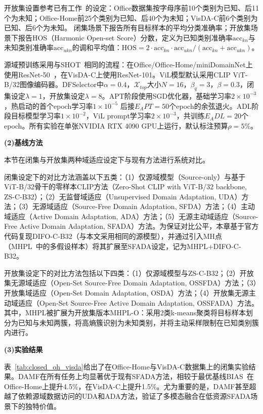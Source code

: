 开放集设置参考已有工作~\cite{liu2021separate}的设定：Office数据集按字母序前10个类别为已知、后11个为未知；Office-Home前25个类别为已知、后40个为未知；VisDA-C前6个类别为已知、后6个为未知。
闭集场景下报告所有目标样本的平均分类准确率；开放集场景下报告HOS（Harmonic Open-set Score）分数，定义为已知类别准确率$\mathrm{acc}_{kn}$与未知类别准确率$\mathrm{acc}_{ukn}$的调和平均值：$\mathrm{HOS}=2\cdot\mathrm{acc}_{kn}\cdot\mathrm{acc}_{ukn}/(\mathrm{acc}_{kn}+\mathrm{acc}_{ukn})$。

源域预训练采用与SHOT~\cite{liang2021source}相同的流程：在Office/Office-Home/miniDomainNet上使用ResNet-50~\cite{he2016deep}，在VisDA-C上使用ResNet-101。ViL模型默认采用CLIP ViT-B/32图像编码器。DFSelector中$\alpha=0.4$，$\mathcal{X}_{top}$大小$N=16$，$\beta_q=3$，$\beta=0.3$，闭集设定$\lambda=1$，开放集设定$\lambda=8$。APT阶段使用SGD优化器，基础学习率$2\times 10^{-3}$，热启动的首个epoch学习率$1\times 10^{-5}$ 后接$E_APT=50$个epoch的余弦退火。ADL阶段目标模型学习率$1\times 10^{-2}$，ViL prompt学习率$2\times 10^{-3}$，共训练$E_ADL=20$个epoch。所有实验在单张NVIDIA RTX 4090 GPU上运行，默认标注预算$\rho=5\%$。

\noindent\textbf{(2)基线方法}

本节在闭集与开放集两种域适应设定下与现有方法进行系统对比。

闭集设定下的对比方法涵盖以下五类：（1）仅源域模型（Source-only）与基于ViT-B/32骨干的零样本CLIP方法（Zero-Shot CLIP with ViT-B/32 backbone, ZS-C-B32）；（2）无监督域适应（Unsupervised Domain Adaptation, UDA）方法；（3）无源域适应（Source-Free Domain Adaptation, SFDA）方法；（4）主动域适应（Active Domain Adaptation, ADA）方法；（5）无源主动域适应（Source-Free Active Domain Adaptation, SFADA）方法。为保证对比公平，本章基于官方代码复现DIFO-C-B32（与本文采用相同的源模型），并通过引入MH点（MHPL~\cite{wang2023mhpl}中的多假设样本）将其扩展至SFADA设定，记为MHPL+DIFO-C-B32。

开放集设定下的对比方法包括以下四类：（1）仅源域模型与ZS-C-B32；（2）开放集无源域适应（Open-Set Source-Free Domain Adaptation, OSSFDA）方法；（3）开放集域适应（Open-Set Domain Adaptation, OSDA）方法；（4）开放集无源主动域适应（Open-Set Source-Free Active Domain Adaptation, OSSFADA）方法。其中，MHPL被扩展为开放集版本MHPL-O：采用2类k-means聚类将目标样本划分为已知与未知两簇，将高熵簇识别为未知类别，并将主动采样限制在已知类别簇内进行。

\noindent\textbf{(3)实验结果}

表~\ref{tab:closed_oh_visda}给出了在Office-Home与VisDA-C数据集上的闭集实验结果。DAMF在所有任务上均显著优于现有SFADA方法，相较于最优基线BIAS~\cite{wang2024bias}在Office-Home上提升4.5\%，在VisDA-C上提升1.5\%。尤为重要的是，DAMF甚至超越了依赖源域数据访问的UDA和ADA方法，验证了多模态融合在低资源SFADA场景下的独特价值。

